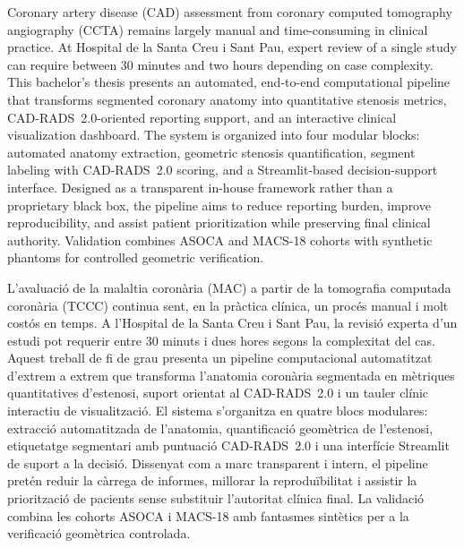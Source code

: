 
\noindent
Coronary artery disease (CAD) assessment from coronary computed tomography angiography (CCTA) remains largely manual and time-consuming in clinical practice. At Hospital de la Santa Creu i Sant Pau, expert review of a single study can require between 30 minutes and two hours depending on case complexity. This bachelor's thesis presents an automated, end-to-end computational pipeline that transforms segmented coronary anatomy into quantitative stenosis metrics, CAD-RADS~2.0-oriented reporting support, and an interactive clinical visualization dashboard. The system is organized into four modular blocks: automated anatomy extraction, geometric stenosis quantification, segment labeling with CAD-RADS~2.0 scoring, and a Streamlit-based decision-support interface. Designed as a transparent in-house framework rather than a proprietary black box, the pipeline aims to reduce reporting burden, improve reproducibility, and assist patient prioritization while preserving final clinical authority. Validation combines ASOCA and MACS-18 cohorts with synthetic phantoms for controlled geometric verification.

\vspace{1.5em}

\noindent
L'avaluació de la malaltia coronària (MAC) a partir de la tomografia computada coronària (TCCC) continua sent, en la pràctica clínica, un procés manual i molt costós en temps. A l'Hospital de la Santa Creu i Sant Pau, la revisió experta d'un estudi pot requerir entre 30 minuts i dues hores segons la complexitat del cas. Aquest treball de fi de grau presenta un pipeline computacional automatitzat d'extrem a extrem que transforma l'anatomia coronària segmentada en mètriques quantitatives d'estenosi, suport orientat al CAD-RADS~2.0 i un tauler clínic interactiu de visualització. El sistema s'organitza en quatre blocs modulares: extracció automatitzada de l'anatomia, quantificació geomètrica de l'estenosi, etiquetatge segmentari amb puntuació CAD-RADS~2.0 i una interfície Streamlit de suport a la decisió. Dissenyat com a marc transparent i intern, el pipeline pretén reduir la càrrega de informes, millorar la reproduïbilitat i assistir la priorització de pacients sense substituir l'autoritat clínica final. La validació combina les cohorts ASOCA i MACS-18 amb fantasmes sintètics per a la verificació geomètrica controlada.

\vspace{1.5em}

